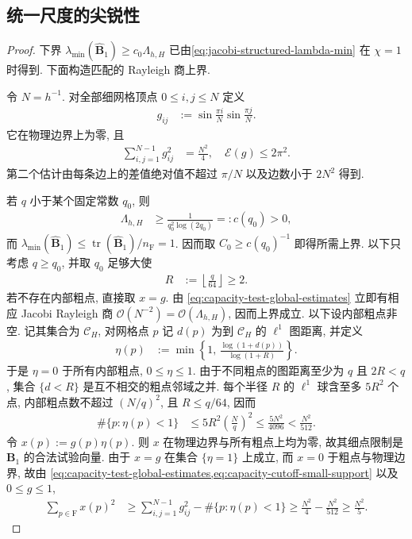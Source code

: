 \documentclass{ctexart}
\newcommand{\q}{\quad}
\renewcommand{\O}{\mathcal{O}}
\renewcommand{\ge}{\geqslant}
\renewcommand{\le}{\leqslant}
\DeclareMathOperator{\tr}{tr}
\begin{document}
\subsection{统一尺度的尖锐性}
\begin{proof}
下界
$\lambda_{\min}(\widehat{\bm B}_1)\ge c_0\Lambda_{h,H}$
已由\cref{eq:jacobi-structured-lambda-min} 在 $\chi=1$ 时得到.
下面构造匹配的 Rayleigh 商上界.

令 $N=h^{-1}$. 对全部细网格顶点
$0\le i,j\le N$ 定义
\begin{align}
    g_{ij}
    &:=
    \sin\frac{\pi i}{N}\sin\frac{\pi j}{N}.
    \label{eq:capacity-test-global-mode}
\end{align}
它在物理边界上为零, 且
\begin{align}
    \sum_{i,j=1}^{N-1}g_{ij}^2
    &=\frac{N^2}{4},\q
    \mathcal E(g)\le2\pi^2.
    \label{eq:capacity-test-global-estimates}
\end{align}
第二个估计由每条边上的差值绝对值不超过 $\pi/N$ 以及边数小于 $2N^2$ 得到.

若 $q$ 小于某个固定常数 $q_0$, 则
\begin{align}
    \Lambda_{h,H}
    &\ge \frac1{q_0^2\log(2q_0)}=:c(q_0)>0,
    \label{eq:capacity-small-q-lower}
\end{align}
而
$\lambda_{\min}(\widehat{\bm B}_1)\le
\tr(\widehat{\bm B}_1)/n_{\mathrm F}=1$.
因而取 $C_0\ge c(q_0)^{-1}$ 即得所需上界. 以下只考虑 $q\ge q_0$, 并取 $q_0$ 足够大使
\begin{align}
    R&:=\left\lfloor\frac q{64}\right\rfloor\ge2.
    \label{eq:capacity-test-radius}
\end{align}
若不存在内部粗点, 直接取 $x=g$. 由
\cref{eq:capacity-test-global-estimates} 立即有相应 Jacobi Rayleigh 商
$\O(N^{-2})=\O(\Lambda_{h,H})$, 因而上界成立.
以下设内部粗点非空. 记其集合为 $\mathcal C_H$, 对网格点 $p$ 记
$d(p)$ 为到 $\mathcal C_H$ 的 $\ell^1$ 图距离, 并定义
\begin{align}
    \eta(p)
    &:=
    \min\left\{
      1,\,
      \frac{\log(1+d(p))}{\log(1+R)}
    \right\}.
    \label{eq:capacity-log-cutoff}
\end{align}
于是 $\eta=0$ 于所有内部粗点, $0\le\eta\le1$.
由于不同粗点的图距离至少为 $q$ 且 $2R<q$,
集合 $\{d<R\}$ 是互不相交的粗点邻域之并.
每个半径 $R$ 的 $\ell^1$ 球含至多 $5R^2$ 个点,
内部粗点数不超过 $(N/q)^2$, 且 $R\le q/64$, 因而
\begin{align}
    \#\{p:\eta(p)<1\}
    &\le 5R^2\left(\frac Nq\right)^2
     \le \frac{5N^2}{4096}
     <\frac{N^2}{512}.
    \label{eq:capacity-cutoff-small-support}
\end{align}
令 $x(p):=g(p)\eta(p)$. 则 $x$ 在物理边界与所有粗点上均为零,
故其细点限制是 $\bm B_1$ 的合法试验向量. 由于 $x=g$ 在集合 $\{\eta=1\}$ 上成立, 而 $x=0$ 于粗点与物理边界,
故由
\cref{eq:capacity-test-global-estimates,eq:capacity-cutoff-small-support}
以及 $0\le g\le1$,
\begin{align}
    \sum_{p\in\mathrm F}x(p)^2
    &\ge
    \sum_{i,j=1}^{N-1}g_{ij}^2
      -\#\{p:\eta(p)<1\}
    \ge
    \frac{N^2}{4}-\frac{N^2}{512}
    \ge\frac{N^2}{5}.
    \label{eq:capacity-test-L2-lower}
\end{align}


\end{proof}
\end{document}
